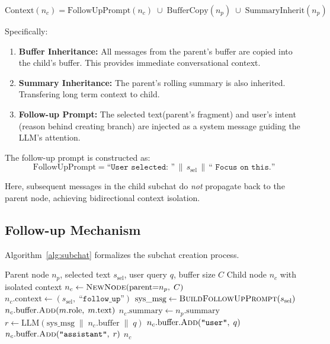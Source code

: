 \begin{equation}
\text{Context}(n_c) = \text{FollowUpPrompt}(n_c) \;\cup\; \text{BufferCopy}(n_p) \;\cup\; \text{SummaryInherit}(n_p)
\label{eq:inheritance}
\end{equation}

Specifically:
\begin{enumerate}
    \item \textbf{Buffer Inheritance:} All messages from the parent's buffer are copied into the child's buffer. This provides immediate conversational context.
    \item \textbf{Summary Inheritance:} The parent's rolling summary is also inherited. Transfering long term context to child.
    \item \textbf{Follow-up Prompt:} The selected text(parent's fragment) and user's intent (reason behind creating branch) are injected as a system message guiding the LLM's attention.
\end{enumerate}

The follow-up prompt is constructed as:
\begin{equation}
\text{FollowUpPrompt} = \texttt{``User selected:~''} \,\|\, s_{\text{sel}} \,\|\, \texttt{``~Focus on this.''}
\label{eq:followup}
\end{equation}

Here, subsequent messages in the child subchat do \emph{not} propagate back to the parent node, achieving bidirectional context isolation.

\subsection{Follow-up Mechanism}\label{subsubsec:followup_alg}

Algorithm~\ref{alg:subchat} formalizes the subchat creation process.

\begin{algorithm}[htbp]
\caption{Follow-up Subchat Creation}\label{alg:subchat}
\begin{algorithmic}[1]
\Require Parent node $n_p$, selected text $s_{\text{sel}}$, user query $q$, buffer size $C$
\Ensure Child node $n_c$ with isolated context
\State $n_c \gets \textsc{NewNode}(\text{parent}{=}n_p,\; C)$
\State $n_c.\text{context} \gets (s_{\text{sel}},\; \texttt{``follow\_up''})$
\State $\text{sys\_msg} \gets \textsc{BuildFollowUpPrompt}(s_{\text{sel}})$
    \State $n_c.\text{buffer}.\textsc{Add}(m.\text{role},\; m.\text{text})$ 
\EndFor
\State $n_c.\text{summary} \gets n_p.\text{summary}$ 
\State $r \gets \text{LLM}\!\left(\text{sys\_msg} \;\|\; n_c.\text{buffer} \;\|\; q\right)$
\State $n_c.\text{buffer}.\textsc{Add}(\texttt{``user''},\; q)$
\State $n_c.\text{buffer}.\textsc{Add}(\texttt{``assistant''},\; r)$
\State \Return $n_c$
\end{algorithmic}
\end{algorithm}

